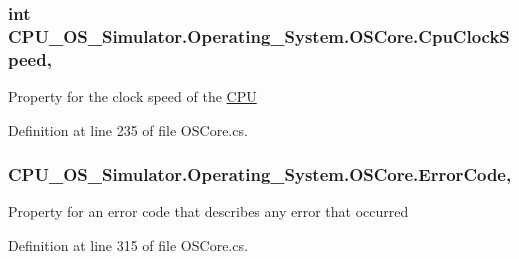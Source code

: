 \subsubsection[{Cpu\+Clock\+Speed}]{\setlength{\rightskip}{0pt plus 5cm}int C\+P\+U\+\_\+\+O\+S\+\_\+\+Simulator.\+Operating\+\_\+\+System.\+O\+S\+Core.\+Cpu\+Clock\+Speed\hspace{0.3cm}{\ttfamily [get]}, {\ttfamily [set]}}\label{class_c_p_u___o_s___simulator_1_1_operating___system_1_1_o_s_core_a1ea93a6cc37dbae4bc607d09fd6e75db}


Property for the clock speed of the \hyperlink{namespace_c_p_u___o_s___simulator_1_1_c_p_u}{C\+P\+U} 



Definition at line 235 of file O\+S\+Core.\+cs.

\hypertarget{class_c_p_u___o_s___simulator_1_1_operating___system_1_1_o_s_core_a77a647e293c14574919b144cb2e8998f}{}
\subsubsection[{Error\+Code}]{ C\+P\+U\+\_\+\+O\+S\+\_\+\+Simulator.\+Operating\+\_\+\+System.\+O\+S\+Core.\+Error\+Code\hspace{0.3cm}{\ttfamily [get]}, {\ttfamily [set]}}\label{class_c_p_u___o_s___simulator_1_1_operating___system_1_1_o_s_core_a77a647e293c14574919b144cb2e8998f}


Property for an error code that describes any error that occurred 



Definition at line 315 of file O\+S\+Core.\+cs.

\hypertarget{class_c_p_u___o_s___simulator_1_1_operating___system_1_1_o_s_core_ac620c813df8b2c9ea386cff20d3fee84}{}
